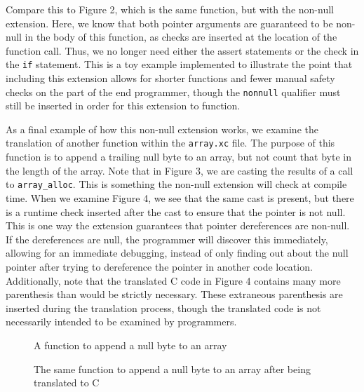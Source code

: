\documentclass[main.tex]{subfiles}
\begin{document}
Compare this to Figure 2, which is the same function, but with the non-null extension. Here, we know that both pointer
arguments are guaranteed to be non-null in the body of this function, as checks are inserted at the location of the function call. 
Thus, we no longer need either the assert statements or the check in
the \verb|if| statement. This is a toy example implemented to illustrate the point that including this extension allows for shorter 
functions and fewer manual safety checks on the part of the end programmer, though the \verb|nonnull| qualifier must still be inserted
in order for this extension to function.

As a final example of how this non-null extension works, we examine the translation of another function within the \verb|array.xc|
file. The purpose of this function is to append a trailing null byte to an array, but not count that byte in the length of the array.
Note that in Figure 3, we are casting the results of a call to \verb|array_alloc|. This is something the non-null extension will check
at compile time. When we examine Figure 4, we see that the same cast is present, but there is a runtime check inserted after
the cast to ensure that the pointer is not null. This is one way the extension guarantees that pointer dereferences are non-null. If the
dereferences are null, the programmer will discover this immediately, allowing for an immediate debugging, instead of only finding out
about the null pointer after trying to dereference the pointer in another code location.
Additionally, note that the translated C code in Figure 4 contains many more parenthesis than would be strictly necessary.
These extraneous parenthesis are inserted during the translation process, though the translated code is not necessarily intended to
be examined by programmers.
\begin{figure}[p]

\caption{A function to append a null byte to an array}
\end{figure}
\begin{figure}[p]

\caption{The same function to append a null byte to an array after being translated to C}
\end{figure}
\end{document}
